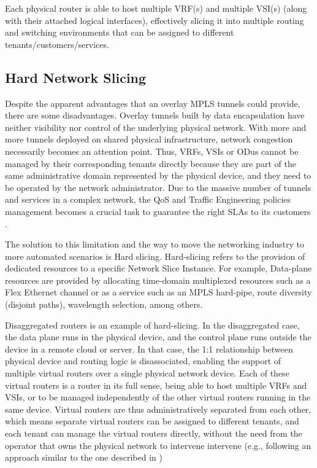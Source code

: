 \documentclass[journal,article,submit,moreauthors,pdftex]{Definitions/mdpi}
\begin{document}
Each physical router is able to host multiple VRF(s) and multiple VSI(s) (along with their attached logical interfaces), effectively slicing it into multiple routing and switching environments that can be assigned to different tenants/customers/services.


\subsection{Hard Network Slicing}
\label{sec:hard}

Despite the apparent advantages that an overlay MPLS tunnels could provide, there are some disadvantages. Overlay tunnels built by data encapsulation have neither visibility nor control of the underlying physical network. With more and more tunnels deployed on shared physical infrastructure, network congestion necessarily becomes an attention point.  Thus, VRFs, VSIs or ODus cannot be managed by their corresponding tenants directly because they are part of the same administrative domain represented by the physical device, and they need to be operated by the network administrator. Due to the massive number of tunnels and services in a complex network, the QoS and Traffic Engineering policies management becomes a crucial task to guarantee the right SLAs to its customers \cite{huang20205g,marotta2020reliable}.

The solution to this limitation and the way to move the networking industry to more automated scenarios is Hard slicing. Hard-slicing refers to the provision of dedicated resources to a specific Network Slice Instance. For example, Data-plane resources are provided by allocating time-domain multiplexed resources such as a Flex Ethernet channel or as a service such as an MPLS hard-pipe, route diversity (disjoint paths), wavelength selection, among others.  

Disaggregated routers is an example of hard-slicing. In the disaggregated case, the data plane runs in the physical device, and the control plane runs outside the device in a remote cloud or server. In that case, the 1:1 relationship between physical device and routing logic is disassociated, enabling the support of multiple virtual routers over a single physical network device. Each of these virtual routers is a router in its full sense, being able to host multiple VRFs and VSIs, or to be managed independently of the other virtual routers running in the same device. Virtual routers are thus administratively separated from each other, which means separate virtual routers can be assigned to different tenants, and each tenant can manage the virtual routers directly, without the need from the operator that owns the physical network to intervene intervene (e.g., following an approach similar to the one described in \cite{contreras2021architecture})
\end{document}
